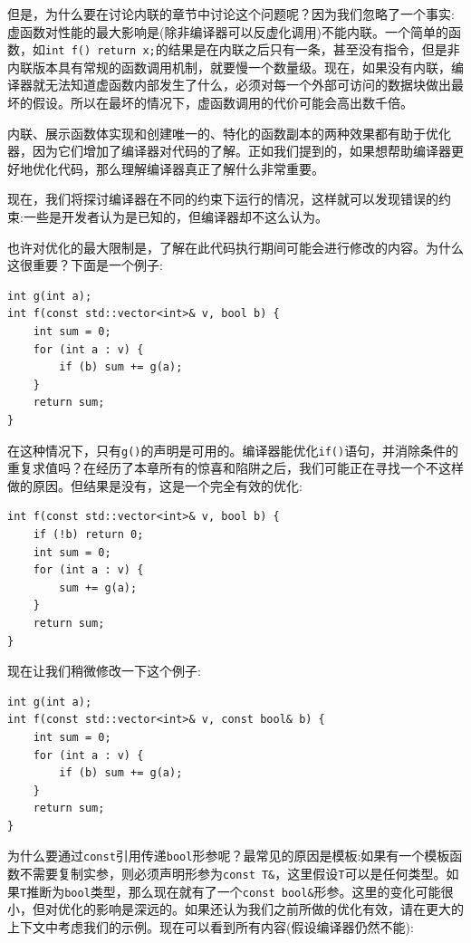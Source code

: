 但是，为什么要在讨论内联的章节中讨论这个问题呢？因为我们忽略了一个事实:虚函数对性能的最大影响是(除非编译器可以反虚化调用)不能内联。一个简单的函数，如\texttt{int f() {return x;}}的结果是在内联之后只有一条，甚至没有指令，但是非内联版本具有常规的函数调用机制，就要慢一个数量级。现在，如果没有内联，编译器就无法知道虚函数内部发生了什么，必须对每一个外部可访问的数据块做出最坏的假设。所以在最坏的情况下，虚函数调用的代价可能会高出数千倍。

内联、展示函数体实现和创建唯一的、特化的函数副本的两种效果都有助于优化器，因为它们增加了编译器对代码的了解。正如我们提到的，如果想帮助编译器更好地优化代码，那么理解编译器真正了解什么非常重要。 

现在，我们将探讨编译器在不同的约束下运行的情况，这样就可以发现错误的约束:一些是开发者认为是已知的，但编译器却不这么认为。 


也许对优化的最大限制是，了解在此代码执行期间可能会进行修改的内容。为什么这很重要？下面是一个例子:

\begin{lstlisting}[style=styleCXX]
int g(int a);
int f(const std::vector<int>& v, bool b) {
	int sum = 0;
	for (int a : v) {
		if (b) sum += g(a);
	}
	return sum;
} 
\end{lstlisting}

在这种情况下，只有\texttt{g()}的声明是可用的。编译器能优化\texttt{if()}语句，并消除条件的重复求值吗？在经历了本章所有的惊喜和陷阱之后，我们可能正在寻找一个不这样做的原因。但结果是没有，这是一个完全有效的优化:

\begin{lstlisting}[style=styleCXX]
int f(const std::vector<int>& v, bool b) {
	if (!b) return 0;
	int sum = 0;
	for (int a : v) {
		sum += g(a);
	}
	return sum;
} 

\end{lstlisting}

现在让我们稍微修改一下这个例子:

\begin{lstlisting}[style=styleCXX]
int g(int a);
int f(const std::vector<int>& v, const bool& b) {
	int sum = 0;
	for (int a : v) {
		if (b) sum += g(a);
	}
	return sum;
} 
\end{lstlisting}

为什么要通过\texttt{const}引用传递\texttt{bool}形参呢？最常见的原因是模板:如果有一个模板函数不需要复制实参，则必须声明形参为\texttt{const T\&}，这里假设\texttt{T}可以是任何类型。如果\texttt{T}推断为\texttt{bool}类型，那么现在就有了一个\texttt{const bool\&}形参。这里的变化可能很小，但对优化的影响是深远的。如果还认为我们之前所做的优化有效，请在更大的上下文中考虑我们的示例。现在可以看到所有内容(假设编译器仍然不能):

